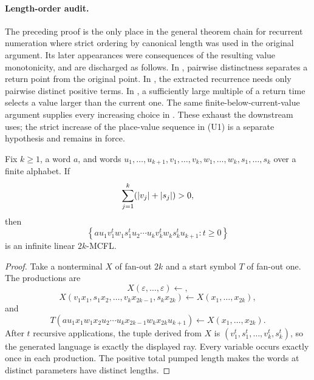 \paragraph{Length-order audit.}
The preceding proof is the only place in the general theorem chain for
recurrent numeration where strict ordering by canonical length was used in the
original argument. Its later appearances were
consequences of the resulting value monotonicity, and are discharged as
follows. In , pairwise distinctness
separates a return point from the original point. In
,
the extracted recurrence needs only pairwise distinct positive terms. In
, a sufficiently large multiple
of a return time selects a value larger than the current one. The same
finite-below-current-value argument supplies every increasing choice in
. These exhaust the downstream uses;
the strict increase of the place-value sequence in \textup{(U1)} is a
separate hypothesis and remains in force.

\begin{lemma}
  \label{lem:synchronized-ray-linear-mcfg}
  Fix \(k\ge1\), a word \(a\), and words
  \(u_1,\ldots,u_{k+1},v_1,\ldots,v_k,w_1,\ldots,w_k,
  s_1,\ldots,s_k\) over a finite alphabet. If
  \[
    \sum_{j=1}^k(\lvert v_j \rvert+\lvert s_j \rvert)>0,
  \]
  then
  \[
    \left\{a u_1v_1^tw_1s_1^tu_2\cdots
      u_kv_k^tw_ks_k^tu_{k+1}:t\ge0\right\}
  \]
  is an infinite linear \(2k\)-MCFL.
\end{lemma}

\begin{proof}
  Take a nonterminal \(X\) of fan-out \(2k\) and a start symbol \(T\) of
  fan-out one. The productions are
  \[
    X(\varepsilon,\ldots,\varepsilon)\leftarrow,
  \]
  \[
    X(v_1x_1,s_1x_2,\ldots,v_kx_{2k-1},s_kx_{2k})
      \leftarrow X(x_1,\ldots,x_{2k}),
  \]
  and
  \[
    T(a u_1x_1w_1x_2u_2\cdots
      u_kx_{2k-1}w_kx_{2k}u_{k+1})
      \leftarrow X(x_1,\ldots,x_{2k}).
  \]
  After \(t\) recursive applications, the tuple derived from \(X\) is
  \((v_1^t,s_1^t,\ldots,v_k^t,s_k^t)\), so the generated language is
  exactly the displayed ray. Every variable occurs exactly once in each
  production. The positive total pumped length makes the words at
  distinct parameters have distinct lengths.
\end{proof}

